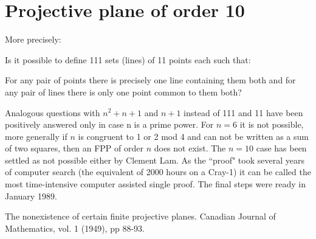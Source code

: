 

\section{Projective plane of order 10}

    More precisely:

    Is it possible to define 111 sets (lines) of 11 points each
    such that:
    
      For any pair of points there is precisely one line containing them
      both and for any pair of lines there is only one point common to
      them both?


 Analogous questions with $n^2 + n + 1$ and $n + 1$ instead of 111 and 11
    have been positively answered only in case n is a prime power.
    For $n=6$ it is not possible, more generally if $n$ is congruent to 1
    or 2 mod 4 and can not be written as a sum of two squares, then an
    FPP of order $n$ does not exist.  The $n=10$ case has been settled as not
    possible either by Clement Lam. As the ``proof" took several years of
    computer search (the equivalent of 2000 hours on a Cray-1) it can be 
    called the most time-intensive computer assisted single proof. The
    final steps were ready in January 1989.

    \Ref

            {The nonexistence of certain finite projective planes.}
            {Canadian Journal of Mathematics,}
            {vol. 1 (1949), pp 88-93.}




